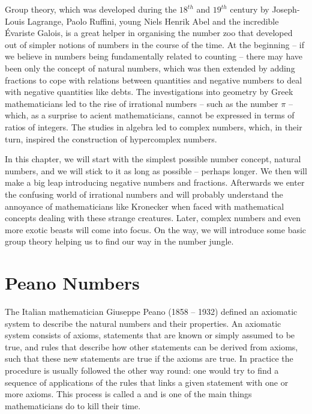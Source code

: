 \documentclass{scrreprt}
\newcommand{\Conid}[1]{\mathit{#1}}
\def\resethooks{%
  \global\let\SaveRestoreHook\empty
  \global\let\ColumnHook\empty}
\let\hspre\empty
\let\hspost\empty
\begin{document}
Group theory, which was developed during the $18^{th}$ and $19^{th}$
century by Joseph-Louis Lagrange, Paolo Ruffini,
young Niels Henrik Abel and the incredible 
Évariste Galois, is a great helper
in organising the number zoo
that developed out of simpler notions of numbers
in the course of the time.
At the beginning -- if we believe in numbers
being fundamentally related to counting -- 
there may have been only the 
concept of natural numbers,
which was then extended by adding fractions
to cope with relations between quantities
and negative numbers to deal with negative quantities
like debts.
The investigations into geometry by Greek mathematicians
led to the rise of irrational numbers -- 
such as the number $\pi$ --
which, as a surprise to acient mathematicians, 
cannot be expressed in terms of ratios of integers.
The studies in algebra led to complex numbers,
which, in their turn, inspired 
the construction of hypercomplex numbers.

In this chapter, we will start 
with the simplest possible number concept,
natural numbers, and we will stick to it
as long as possible -- perhaps longer.
We then will make a big leap introducing
negative numbers and fractions.
Afterwards we enter the confusing world
of irrational numbers and will probably understand
the annoyance of mathematicians like Kronecker
when faced with mathematical concepts dealing
with these strange creatures.
Later, complex numbers and
even more exotic beasts will come
into focus.
On the way, we will introduce some basic group theory 
helping us to find our way in the number jungle.

\section{Peano Numbers}
\ignore{
\begingroup\par\noindent\advance\leftskip\mathindent\(
\begin{pboxed}\SaveRestoreHook
\column{B}{@{}>{\hspre}l<{\hspost}@{}}%
\column{E}{@{}>{\hspre}l<{\hspost}@{}}%
\>[B]{}\mathbf{module}\;\Conid{Peano}{}\<[E]%
\\
\>[B]{}\mathbf{where}{}\<[E]%
\ColumnHook
\end{pboxed}
\)\par\noindent\endgroup\resethooks
}


The Italian mathematician Giuseppe Peano (1858 -- 1932)
defined an axiomatic system to describe the natural numbers
and their properties.
An axiomatic system consists of axioms,
statements that are known or simply assumed
to be true,
and rules that describe
how other statements can be derived from axioms,
such that these new statements
are true if the axioms are true.
In practice the procedure is usually 
followed the other way round: 
one would try to find a 
sequence of applications of the rules
that links a given statement with one or more axioms.
This process is called a 
and is one of the main things
mathematicians do to kill their time.
\end{document}
